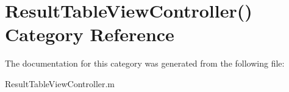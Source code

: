 \section{Result\+Table\+View\+Controller() Category Reference}
\label{category_result_table_view_controller_07_08}


The documentation for this category was generated from the following file\+:\begin{DoxyCompactItemize}
\item 
Result\+Table\+View\+Controller.\+m\end{DoxyCompactItemize}
